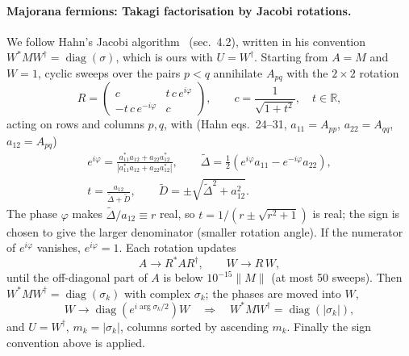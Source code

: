 \documentclass[11pt]{article}
\newcommand{\diag}{\operatorname{diag}}
\begin{document}
\paragraph{Majorana fermions: Takagi factorisation by Jacobi rotations.} We follow Hahn's
Jacobi algorithm~\cite{Hahn} (sec.~4.2), written in his convention
$W^* M W^\dagger = \diag(\sigma)$, which is ours with $U = W^\dagger$. Starting from $A = M$
and $W = 1$, cyclic sweeps over the pairs $p<q$ annihilate $A_{pq}$ with the $2\times2$
rotation
\begin{equation}
  R = \begin{pmatrix} c & t\,c\,e^{i\varphi} \\ -t\,c\,e^{-i\varphi} & c \end{pmatrix},
  \qquad c = \frac{1}{\sqrt{1+t^2}},\quad t\in\mathbb R,
\end{equation}
acting on rows and columns $p,q$, with (Hahn eqs.~24--31, $a_{11}=A_{pp}$, $a_{22}=A_{qq}$,
$a_{12}=A_{pq}$)
\begin{gather}
  e^{i\varphi} = \frac{a_{11}^* a_{12} + a_{22} a_{12}^*}{\left|a_{11}^* a_{12} + a_{22} a_{12}^*\right|},
  \qquad
  \tilde\Delta = \tfrac12\left(e^{i\varphi} a_{11} - e^{-i\varphi} a_{22}\right),\\
  t = \frac{a_{12}}{\tilde\Delta + \tilde D},\qquad
  \tilde D = \pm\sqrt{\tilde\Delta^2 + a_{12}^2}.
\end{gather}
The phase $\varphi$ makes $\tilde\Delta/a_{12} \equiv r$ real, so $t = 1/(r\pm\sqrt{r^2+1})$
is real; the sign is chosen to give the larger denominator (smaller rotation angle). If the
numerator of $e^{i\varphi}$ vanishes, $e^{i\varphi}=1$. Each rotation updates
\begin{equation}
  A \to R^* A R^\dagger, \qquad W \to R\,W ,
\end{equation}
until the off-diagonal part of $A$ is below $10^{-15}\|M\|$ (at most 50 sweeps). Then
$W^* M W^\dagger = \diag(\sigma_k)$ with complex $\sigma_k$; the phases are moved into $W$,
\begin{equation}
  W \to \diag\!\left(e^{i\arg\sigma_k/2}\right) W
  \quad\Rightarrow\quad W^* M W^\dagger = \diag(|\sigma_k|),
\end{equation}
and $U = W^\dagger$, $m_k = |\sigma_k|$, columns sorted by ascending $m_k$. Finally the sign
convention above is applied.
\end{document}
